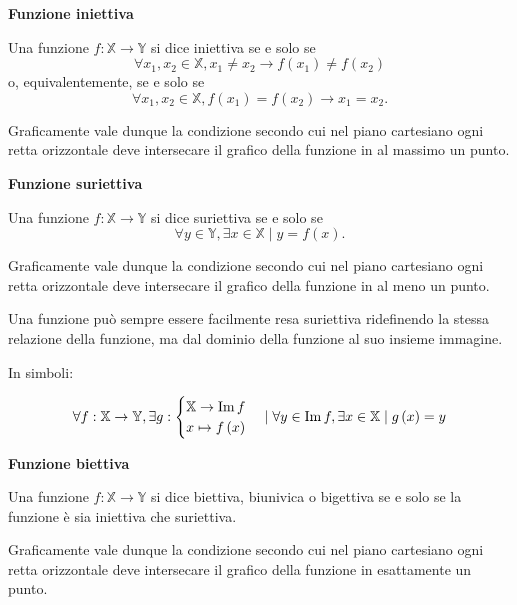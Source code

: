 \begin{definition}
    \textbf{Funzione iniettiva}

    Una funzione $f:\mathbb{X}\rightarrow\mathbb{Y}$ si dice iniettiva se e solo se
    \[ \forall x_1, x_2 \in\mathbb{X}, x_1\neq x_2 \rightarrow f\left(x_1\right)\neq f\left(x_2\right)\]
    o, equivalentemente, se e solo se
    \[ \forall x_1, x_2 \in\mathbb{X}, f\left(x_1\right) = f\left(x_2\right) \rightarrow x_1= x_2.\]

    Graficamente vale dunque la condizione secondo cui nel piano cartesiano ogni retta
    orizzontale deve intersecare il grafico della funzione in al massimo un punto.
\end{definition}

\begin{definition}
    \textbf{Funzione suriettiva}

    Una funzione $f:\mathbb{X}\rightarrow\mathbb{Y}$ si dice suriettiva se e solo se
    \[ \forall y \in\mathbb{Y}, \exists x\in\mathbb{X} \mid y=f\left(x\right).\]

    Graficamente vale dunque la condizione secondo cui nel piano cartesiano ogni retta
    orizzontale deve intersecare il grafico della funzione in al meno un punto.
\end{definition}

\begin{observation}
    Una funzione può sempre essere facilmente resa suriettiva ridefinendo la stessa relazione
    della funzione, ma dal dominio della funzione al suo insieme immagine.
    
    In simboli:

    \[ \forall f: \mathbb{X}\rightarrow\mathbb{Y},
    \exists g:\begin{cases}
        \mathbb{X}\rightarrow\operatorname{Im}f \\
        x\mapsto f\left(x\right)
    \end{cases}\mid \forall y\in\operatorname{Im}f,
    \exists x\in\mathbb{X}\mid g\left(x\right)=y\]
\end{observation}

\begin{definition}
    \textbf{Funzione biettiva}

    Una funzione $f:\mathbb{X}\rightarrow\mathbb{Y}$ si dice biettiva, biunivica o bigettiva
    se e solo se la funzione è sia iniettiva che suriettiva.

    Graficamente vale dunque la condizione secondo cui nel piano cartesiano ogni retta
    orizzontale deve intersecare il grafico della funzione in esattamente un punto.
\end{definition}